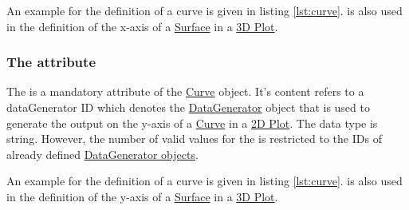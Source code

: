An example for the definition of a curve is given in listing \ref{lst:curve}.
 is also used in the definition of the x-axis of a \hyperref[class:surface]{Surface} in a \hyperref[class:plot3D]{3D Plot}.

\subsubsection{The  attribute}
\label{sec:yDataReference}
The  is a mandatory attribute of the \hyperref[class:curve]{Curve} object. It's content refers to a dataGenerator ID which denotes the \hyperref[class:dataGenerator]{DataGenerator} object that is used to generate the output on the y-axis of a \hyperref[class:curve]{Curve} in a \hyperref[class:plot2D]{2D Plot}.
The  data type is string. However, the number of valid values for the  is restricted to the IDs of already defined \hyperref[class:dataGenerator]{DataGenerator objects}.

An example for the definition of a curve is given in listing \ref{lst:curve}.
 is also used in the definition of the y-axis of a \hyperref[class:surface]{Surface} in a \hyperref[class:plot3D]{3D Plot}.

